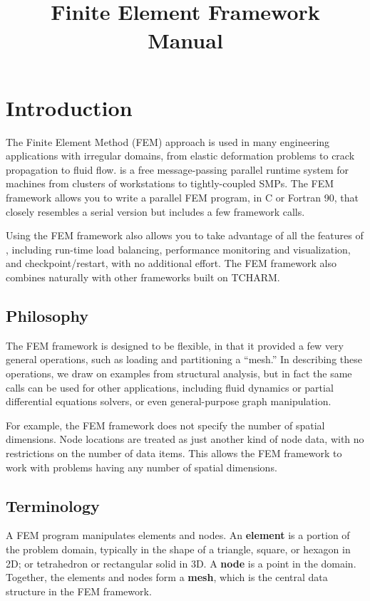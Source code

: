 \documentclass[10pt]{article}
\title{\charmpp\\ Finite Element Framework\\ Manual}
\begin{document}
\maketitle

\section{Introduction}

The Finite Element Method (FEM) approach is used in many engineering
applications with irregular domains, from elastic deformation problems to
crack propagation to fluid flow.  \charmpp{} is a free message-passing parallel
runtime system for machines from clusters of workstations to tightly-coupled
SMPs.  The \charmpp{} FEM framework allows you to write a parallel FEM program,
in C or Fortran 90, that closely resembles a serial version but includes
a few framework calls.

Using the FEM framework also allows you to take advantage of all the
features of \charmpp, including run-time load balancing,  performance
monitoring and visualization, and checkpoint/restart, with no additional
effort. The FEM framework also combines naturally with other \charmpp
frameworks built on TCHARM.

\subsection{Philosophy}

The \charmpp{} FEM framework is designed to be flexible, in that it
provided a few very general operations, such as loading and partitioning 
a ``mesh.''  
In describing these operations, we draw on examples from structural analysis,
but in fact the same calls can be used for other applications, including
fluid dynamics or partial differential equations solvers, or
even general-purpose graph manipulation.

For example, the FEM framework does not specify the number of spatial
dimensions.  Node locations are treated as just another kind of node data,
with no restrictions on the number of data items.
This allows the FEM framework to work with problems having any number 
of spatial dimensions.


\subsection{Terminology}

A FEM program manipulates elements and nodes. An {\bf element} is a portion of
the problem domain, typically in the shape of a triangle, square, or hexagon
in 2D; or tetrahedron or rectangular solid in 3D.  A {\bf node} is a point in the
domain.  Together, the elements and nodes form a {\bf mesh}, which is the 
central data structure in the FEM framework.
\end{document}
